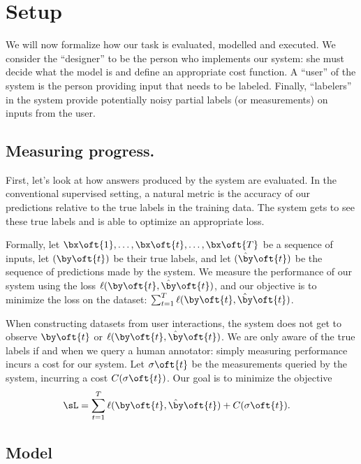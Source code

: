 \section{Setup}
\label{sec:problem}

We will now formalize how our task is evaluated, modelled and executed. 
We consider the ``designer'' to be the person who implements our system: she must decide what the model is and define an appropriate cost function.
A ``user'' of the system is the person providing input that needs to be labeled. 
Finally, ``labelers'' in the system provide potentially noisy partial labels (or measurements) on inputs from the user. 

\subsection{Measuring progress.}

First, let's look at how answers produced by the system are evaluated.
In the conventional supervised setting, a natural metric is the accuracy of our predictions relative to the true labels in the training data.
The system gets to see these true labels and is able to optimize an appropriate loss.

Formally, let $\bx\oft{1}, \dots, \bx\oft{t}, \dots, \bx\oft{T}$ be a sequence of inputs, 
let $(\by\oft{t})$ be their true labels,
and let $(\byt\oft{t})$ be the sequence of predictions made by the system.
We measure the performance of our system using the loss $\ell(\by\oft{t}, \byt\oft{t})$, and our objective is to minimize the loss on the dataset: $\sum_{t=1}^T \ell(\by\oft{t}, \byt\oft{t})$.

When constructing datasets from user interactions, the system does not get to observe $\by\oft{t}$ or $\ell(\by\oft{t}, \byt\oft{t})$.
We are only aware of the true labels if and when we query a human annotator: simply measuring performance incurs a cost for our system.
Let $\sigma\oft{t}$ be the measurements queried by the system, incurring a cost $C(\sigma\oft{t})$.
Our goal is to minimize the objective
\begin{align*}
  \sL &= \sum_{t=1}^T \ell(\by\oft{t}, \byt\oft{t}) + C(\sigma\oft{t}).
\end{align*}

\subsection{Model}

